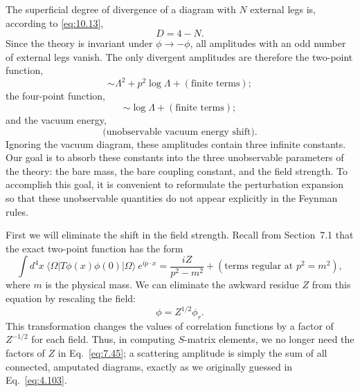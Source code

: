 The superficial degree of divergence of a diagram with $N$ external legs is,
according to \eqref{eq:10.13},
\begin{equation}
  D = 4 - N .
\end{equation}
Since the theory is invariant under $\phi\to-\phi$, all amplitudes with an odd
number of external legs vanish.  The only divergent amplitudes are therefore
the two-point function,
\begin{equation}
  \sim \Lambda^2 + p^2\log\Lambda + (\text{finite terms}) ;
\end{equation}
the four-point function,
\begin{equation}
  \sim \log\Lambda + (\text{finite terms}) ;
\end{equation}
and the vacuum energy,
\begin{equation}
  \text{(unobservable vacuum energy shift)} .
\end{equation}
Ignoring the vacuum diagram, these amplitudes contain three infinite
constants.  Our goal is to absorb these constants into the three unobservable
parameters of the theory: the bare mass, the bare coupling constant, and the
field strength.  To accomplish this goal, it is convenient to reformulate the
perturbation expansion so that these unobservable quantities do not appear
explicitly in the Feynman rules.

First we will eliminate the shift in the field strength.  Recall from
Section~7.1 that the exact two-point function has the form
\begin{equation}
  \int d^4x\ \langle\Omega|T\phi(x)\phi(0)|\Omega\rangle\ e^{ip\cdot x}
  = \frac{iZ}{p^2-m^2} + (\text{terms regular at } p^2 = m^2),
  \label{eq:10.14}
\end{equation}
where $m$ is the physical mass.  We can eliminate the awkward residue $Z$ from
this equation by rescaling the field:
\begin{equation}
  \phi = Z^{1/2}\phi_r .
  \label{eq:10.15}
\end{equation}
This transformation changes the values of correlation functions by a factor of
$Z^{-1/2}$ for each field.  Thus, in computing $S$-matrix elements, we no
longer need the factors of $Z$ in Eq.~\eqref{eq:7.45}; a scattering amplitude
is simply the sum of all connected, amputated diagrams, exactly as we
originally guessed in Eq.~\eqref{eq:4.103}.


